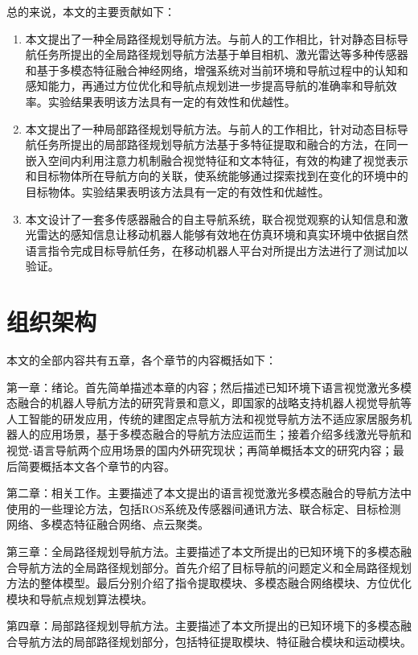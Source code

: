 	总的来说，本文的主要贡献如下：
	\begin{enumerate}[topsep = 0 pt, itemsep= 0 pt, parsep=0pt, partopsep=0pt, leftmargin=44pt, itemindent=0pt, labelsep=6pt, label=(\arabic*)]
		\item 	本文提出了一种全局路径规划导航方法。与前人的工作相比，针对静态目标导航任务所提出的全局路径规划导航方法基于单目相机、激光雷达等多种传感器和基于多模态特征融合神经网络，增强系统对当前环境和导航过程中的认知和感知能力，再通过方位优化和导航点规划进一步提高导航的准确率和导航效率。实验结果表明该方法具有一定的有效性和优越性。
		\item	本文提出了一种局部路径规划导航方法。与前人的工作相比，针对动态目标导航任务所提出的局部路径规划导航方法基于多特征提取和融合的方法，在同一嵌入空间内利用注意力机制融合视觉特征和文本特征，有效的构建了视觉表示和目标物体所在导航方向的关联，使系统能够通过探索找到在变化的环境中的目标物体。实验结果表明该方法具有一定的有效性和优越性。
		\item	本文设计了一套多传感器融合的自主导航系统，联合视觉观察的认知信息和激光雷达的感知信息让移动机器人能够有效地在仿真环境和真实环境中依据自然语言指令完成目标导航任务，在移动机器人平台对所提出方法进行了测试加以验证。
	\end{enumerate}


\section{组织架构}
	本文的全部内容共有五章，各个章节的内容概括如下：

	第一章：绪论。首先简单描述本章的内容；然后描述已知环境下语言视觉激光多模态融合的机器人导航方法的研究背景和意义，即国家的战略支持机器人视觉导航等人工智能的研发应用，传统的建图定点导航方法和视觉导航方法不适应家居服务机器人的应用场景，基于多模态融合的导航方法应运而生；接着介绍多线激光导航和视觉-语言导航两个应用场景的国内外研究现状；再简单概括本文的研究内容；最后简要概括本文各个章节的内容。

	第二章：相关工作。主要描述了本文提出的语言视觉激光多模态融合的导航方法中使用的一些理论方法，包括ROS系统及传感器间通讯方法、联合标定、目标检测网络、多模态特征融合网络、点云聚类。

	第三章：全局路径规划导航方法。主要描述了本文所提出的已知环境下的多模态融合导航方法的全局路径规划部分。首先介绍了目标导航的问题定义和全局路径规划方法的整体模型。最后分别介绍了指令提取模块、多模态融合网络模块、方位优化模块和导航点规划算法模块。

	第四章：局部路径规划导航方法。主要描述了本文所提出的已知环境下的多模态融合导航方法的局部路径规划部分，包括特征提取模块、特征融合模块和运动模块。

